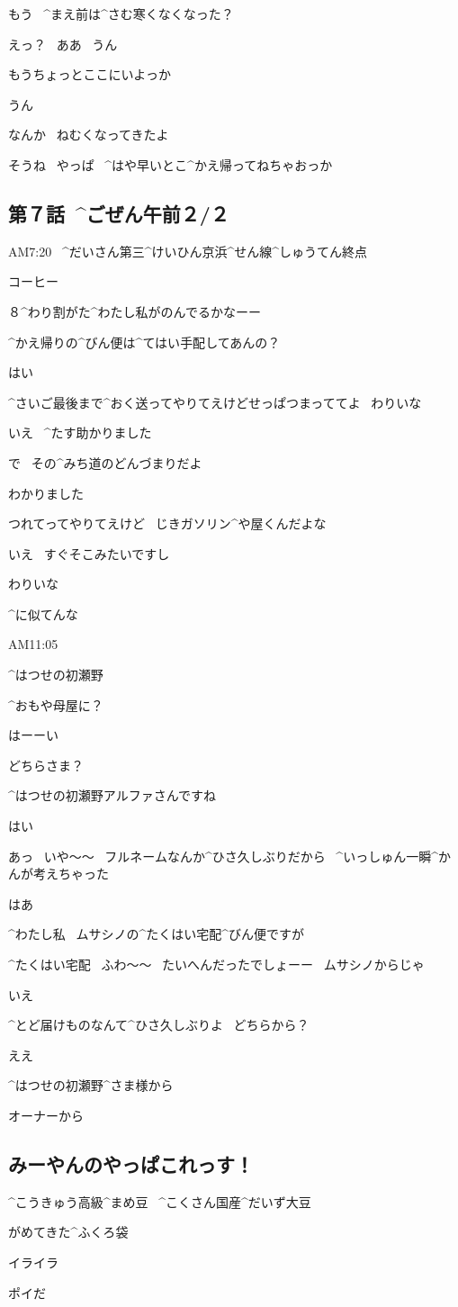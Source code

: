 \page
\Takahiro もう
\ ^{まえ}{前}は^{さむ}{寒}くなくなった？

\Alpha えっ？
\ ああ
\ うん

\Alpha もうちょっとここにいよっか

\Alpha うん

\page
\Takahiro なんか
\ ねむくなってきたよ

\Alpha そうね
\ やっぱ
\ ^{はや}{早}いとこ^{かえ}{帰}ってねちゃおっか


\subsection{第７話\ ^{ごぜん}{午前}２/２}

\page[132]
\Narrator AM7:20
\ ^{だいさん}{第三}^{けいひん}{京浜}^{せん}{線}^{しゅうてん}{終点}

\page[138]
\Alpha コーヒー

\Alpha ８^{わり}{割}がた^{わたし}{私}がのんでるかなーー

\page
\Person ^{かえ}{帰}りの^{びん}{便}は^{てはい}{手配}してあんの？

\Kokone はい

\Person ^{さいご}{最後}まで^{おく}{送}ってやりてえけどせっぱつまっててよ
\ わりいな

\Kokone いえ
\ ^{たす}{助}かりました

\page[141]
\Ojisan で
\ その^{みち}{道}のどんづまりだよ

\Kokone わかりました

\Ojisan つれてってやりてえけど
\ じきガソリン^{や}{屋}くんだよな

\Kokone いえ
\ すぐそこみたいですし

\Ojisan わりいな

\Ojisan ^{に}{似}てんな

\page
\Narrator AM11:05

\page
\Kokone ^{はつせの}{初瀬野}

\page
\Alpha ^{おもや}{母屋}に？

\Alpha はーーい

\Alpha どちらさま？

\page
\Kokone ^{はつせの}{初瀬野}アルファさんですね

\Alpha はい

\Alpha あっ
\ いや〜〜
\ フルネームなんか^{ひさ}{久}しぶりだから
\ ^{いっしゅん}{一瞬}^{かんが}{考}えちゃった

\Kokone はあ

\Kokone ^{わたし}{私}
\ ムサシノの^{たくはい}{宅配}^{びん}{便}ですが

\Alpha ^{たくはい}{宅配}
\ ふわ〜〜
\ たいへんだったでしょーー
\ ムサシノからじゃ

\Kokone いえ

\page
\Alpha ^{とど}{届}けものなんて^{ひさ}{久}しぶりよ
\ どちらから？

\Kokone ええ

\Kokone ^{はつせの}{初瀬野}^{さま}{様}から

\Alpha オーナーから


\subsection{みーやんのやっぱこれっす！}

\Sign ^{こうきゅう}{高級}^{まめ}{豆}
\ ^{こくさん}{国産}^{だいず}{大豆}

\Sign がめてきた^{ふくろ}{袋}

\Sign イライラ

\Sign ポイだ
